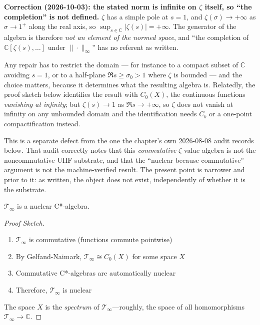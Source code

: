 \medskip
\noindent\textbf{Correction (2026-10-03): the stated norm is infinite on
$\zeta$ itself, so ``the completion'' is not defined.}
$\zeta$ has a simple pole at $s = 1$, and $\zeta(\sigma) \to +\infty$ as
$\sigma \to 1^+$ along the real axis, so
$\sup_{s \in \mathbb{C}} |\zeta(s)| = +\infty$. The generator of the algebra is
therefore \emph{not an element of the normed space}, and ``the completion of
$\mathbb{C}[\zeta(s),\dots]$ under $\|\cdot\|_\infty$'' has no referent as
written.

Any repair has to restrict the domain --- for instance to a compact subset of
$\mathbb{C}$ avoiding $s = 1$, or to a half-plane $\Re s \geq \sigma_0 > 1$ where
$\zeta$ is bounded --- and the choice matters, because it determines what the
resulting algebra is. Relatedly, the proof sketch below identifies the result with
$C_0(X)$, the continuous functions \emph{vanishing at infinity}; but
$\zeta(s) \to 1$ as $\Re s \to +\infty$, so $\zeta$ does not vanish at infinity
on any unbounded domain and the identification needs $C_b$ or a one-point
compactification instead.

This is a separate defect from the one the chapter's own 2026-08-08 audit records
below. That audit correctly notes that this \emph{commutative} $\zeta$-value
algebra is not the noncommutative UHF substrate, and that the ``nuclear because
commutative'' argument is not the machine-verified result. The present point is
narrower and prior to it: as written, the object does not exist, independently of
whether it is the substrate.

\begin{theorem}\label{thm:timeless-field-nuclear}
$\mathcal{T}_\infty$ is a nuclear C*-algebra.
\end{theorem}

\begin{proof}[Proof Sketch]
\begin{enumerate}
\item $\mathcal{T}_\infty$ is commutative (functions commute pointwise)
\item By Gelfand-Naimark, $\mathcal{T}_\infty \cong C_0(X)$ for some space $X$
\item Commutative C*-algebras are automatically nuclear
\item Therefore, $\mathcal{T}_\infty$ is nuclear
\end{enumerate}

The space $X$ is the \textit{spectrum} of $\mathcal{T}_\infty$---roughly, the space of all homomorphisms $\mathcal{T}_\infty \to \mathbb{C}$.
\end{proof}

